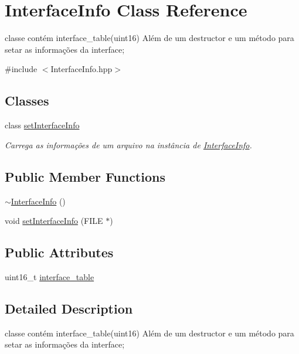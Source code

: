 \hypertarget{class_interface_info}{}\section{Interface\+Info Class Reference}
\label{class_interface_info}


classe contém interface\+\_\+table(uint16) Além de um destructor e um método para setar as informações da interface;  




{\ttfamily \#include $<$Interface\+Info.\+hpp$>$}

\subsection*{Classes}
\begin{DoxyCompactItemize}
\item 
class \hyperlink{class_interface_info_1_1set_interface_info}{set\+Interface\+Info}
\begin{DoxyCompactList}\small\item\em Carrega as informações de um arquivo na instância de \hyperlink{class_interface_info}{Interface\+Info}. \end{DoxyCompactList}\end{DoxyCompactItemize}
\subsection*{Public Member Functions}
\begin{DoxyCompactItemize}
\item 
\hyperlink{class_interface_info_a8076e3917229d36ac006576adb5fd404}{$\sim$\+Interface\+Info} ()
\item 
void \hyperlink{class_interface_info_a9fa9166bbfee8837d611da9a88d1ba67}{set\+Interface\+Info} (F\+I\+LE $\ast$)
\end{DoxyCompactItemize}
\subsection*{Public Attributes}
\begin{DoxyCompactItemize}
\item 
uint16\+\_\+t \hyperlink{class_interface_info_a5f6c0c20f598a2e8d000a9513776099c}{interface\+\_\+table}
\end{DoxyCompactItemize}


\subsection{Detailed Description}
classe contém interface\+\_\+table(uint16) Além de um destructor e um método para setar as informações da interface; 

